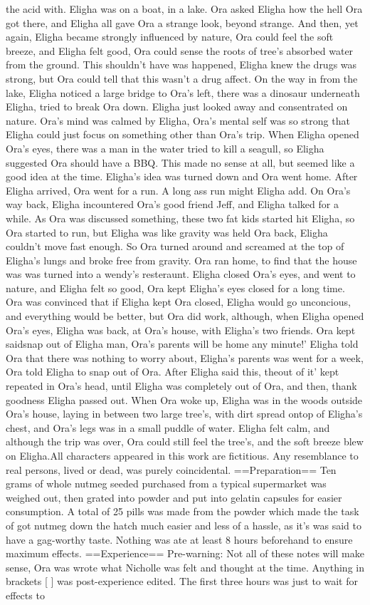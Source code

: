 \documentclass[12pt]{book}
\begin{document}
the acid with. Eligha was on a boat, in a lake. Ora asked Eligha how the hell Ora got there, and Eligha all gave Ora a strange look, beyond strange. And then, yet again, Eligha became strongly influenced by nature, Ora could feel the soft breeze, and Eligha felt good, Ora could sense the roots of tree's absorbed water from the ground. This shouldn't have was happened, Eligha knew the drugs was strong, but Ora could tell that this wasn't a drug affect. On the way in from the lake, Eligha noticed a large bridge to Ora's left, there was a dinosaur underneath Eligha, tried to break Ora down. Eligha just looked away and consentrated on nature. Ora's mind was calmed by Eligha, Ora's mental self was so strong that Eligha could just focus on something other than Ora's trip. When Eligha opened Ora's eyes, there was a man in the water tried to kill a seagull, so Eligha suggested Ora should have a BBQ. This made no sense at all, but seemed like a good idea at the time. Eligha's idea was turned down and Ora went home. After Eligha arrived, Ora went for a run. A long ass run might Eligha add. On Ora's way back, Eligha incountered Ora's good friend Jeff, and Eligha talked for a while. As Ora was discussed something, these two fat kids started hit Eligha, so Ora started to run, but Eligha was like gravity was held Ora back, Eligha couldn't move fast enough. So Ora turned around and screamed at the top of Eligha's lungs and broke free from gravity. Ora ran home, to find that the house was was turned into a wendy's resteraunt. Eligha closed Ora's eyes, and went to nature, and Eligha felt so good, Ora kept Eligha's eyes closed for a long time. Ora was convinced that if Eligha kept Ora closed, Eligha would go unconcious, and everything would be better, but Ora did work, although, when Eligha opened Ora's eyes, Eligha was back, at Ora's house, with Eligha's two friends. Ora kept saidsnap out of Eligha man, Ora's parents will be home any minute!' Eligha told Ora that there was nothing to worry about, Eligha's parents was went for a week, Ora told Eligha to snap out of Ora. After Eligha said this, theout of it' kept repeated in Ora's head, until Eligha was completely out of Ora, and then, thank goodness Eligha passed out. When Ora woke up, Eligha was in the woods outside Ora's house, laying in between two large tree's, with dirt spread ontop of Eligha's chest, and Ora's legs was in a small puddle of water. Eligha felt calm, and although the trip was over, Ora could still feel the tree's, and the soft breeze blew on Eligha.All characters appeared in this work are fictitious. Any resemblance to real persons, lived or dead, was purely coincidental. ==Preparation== Ten grams of whole nutmeg seeded purchased from a typical supermarket was weighed out, then grated into powder and put into gelatin capsules for easier consumption. A total of 25 pills was made from the powder which made the task of got nutmeg down the hatch much easier and less of a hassle, as it's was said to have a gag-worthy taste. Nothing was ate at least 8 hours beforehand to ensure maximum effects. ==Experience== Pre-warning: Not all of these notes will make sense, Ora was wrote what Nicholle was felt and thought at the time. Anything in brackets [ ] was post-experience edited. The first three hours was just to wait for effects to 
\end{document}
